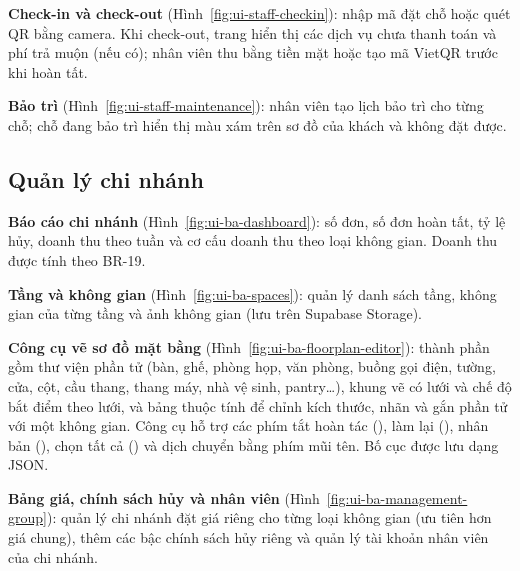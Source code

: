 \textbf{Check-in và check-out} (Hình~\ref{fig:ui-staff-checkin}): nhập mã đặt chỗ hoặc quét QR bằng camera. Khi check-out, trang hiển thị các dịch vụ chưa thanh toán và phí trả muộn (nếu có); nhân viên thu bằng tiền mặt hoặc tạo mã VietQR trước khi hoàn tất.


\textbf{Bảo trì} (Hình~\ref{fig:ui-staff-maintenance}): nhân viên tạo lịch bảo trì cho từng chỗ; chỗ đang bảo trì hiển thị màu xám trên sơ đồ của khách và không đặt được.


\subsection{Quản lý chi nhánh}

\textbf{Báo cáo chi nhánh} (Hình~\ref{fig:ui-ba-dashboard}): số đơn, số đơn hoàn tất, tỷ lệ hủy, doanh thu theo tuần và cơ cấu doanh thu theo loại không gian. Doanh thu được tính theo BR-19.


\textbf{Tầng và không gian} (Hình~\ref{fig:ui-ba-spaces}): quản lý danh sách tầng, không gian của từng tầng và ảnh không gian (lưu trên Supabase Storage).


\textbf{Công cụ vẽ sơ đồ mặt bằng} (Hình~\ref{fig:ui-ba-floorplan-editor}): thành phần  gồm thư viện phần tử (bàn, ghế, phòng họp, văn phòng, buồng gọi điện, tường, cửa, cột, cầu thang, thang máy, nhà vệ sinh, pantry\ldots), khung vẽ có lưới và chế độ bắt điểm theo lưới, và bảng thuộc tính để chỉnh kích thước, nhãn và gắn phần tử với một không gian. Công cụ hỗ trợ các phím tắt hoàn tác (), làm lại (), nhân bản (), chọn tất cả () và dịch chuyển bằng phím mũi tên. Bố cục được lưu dạng JSON.


\textbf{Bảng giá, chính sách hủy và nhân viên} (Hình~\ref{fig:ui-ba-management-group}): quản lý chi nhánh đặt giá riêng cho từng loại không gian (ưu tiên hơn giá chung), thêm các bậc chính sách hủy riêng và quản lý tài khoản nhân viên của chi nhánh.

